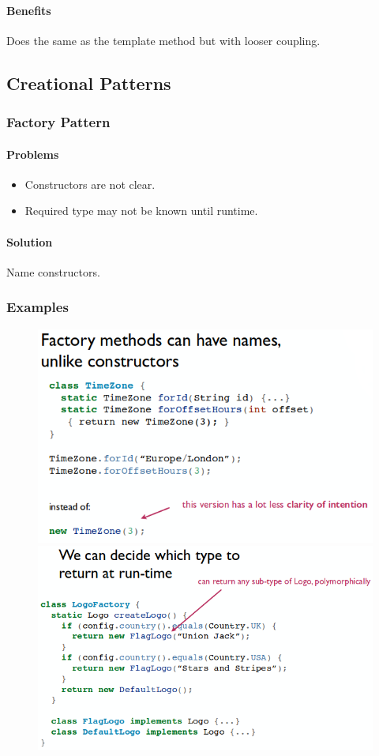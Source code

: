 \documentclass[twocolumn,english]{article}
\begin{document}
\paragraph{Benefits}

Does the same as the template method but with looser coupling.

\subsection{Creational Patterns}

\subsubsection{Factory Pattern}

\paragraph{Problems}
\begin{itemize}
\item Constructors are not clear.
\item Required type may not be known until runtime.
\end{itemize}

\paragraph{Solution}

Name constructors.

\subsubsection*{Examples}

\begin{figure}[H]
\centering{}\includegraphics[width=0.45\columnwidth]{img/factory}\includegraphics[width=0.5\columnwidth]{img/factory2}
\end{figure}
\end{document}
